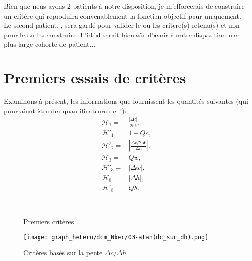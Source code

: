 \documentclass[main.tex]{subfiles}
\begin{document}
Bien que nous ayons 2 patients à notre disposition, je m'efforcerais de construire un critère qui reproduira convenablement la fonction objectif pour \Nber uniquement. Le second patient, \Chen, sera gardé pour valider le ou les critère(s) retenu(s) et non pour le ou les construire. L'idéal serait bien sûr d'avoir à notre disposition une plus large cohorte de patient...

\section{Premiers essais de critères}
Examinons à présent, les informations que fournissent les quantités suivantes (qui pourraient être des quantificateurs de l'\hetero):
\begin{align}
\mathcal{H}_1 =& \frac{|\Delta c |}{256}, \\
\mathcal{H}'_1 =& 1-Qc, \\ %
\mathcal{H}'_2 =& \left| \frac{\Delta c / 256 }{\Delta h}\right|, \\
\mathcal{H}_3 =& Qw, \\ %
\mathcal{H}'_3 =& |\Delta w|, \\
\mathcal{H}_8 =& |\Delta h|, \\
\mathcal{H}'_8 =& Qh. %
\end{align}

\begin{figure}[htpb]
\\
\centering
{}
\caption{\label{fig:premiers_criteres}Premiers critères}
\end{figure}
\begin{figure}[htpb]
\centering
\texttt{[image: graph\_hetero/dcm\_Nber/03-atan(dc\_sur\_dh).png]}
\caption{\label{fig:critere_dc_sur_dh}Critères basés sur la pente $\Delta c / \Delta h$}
\end{figure}
\end{document}
